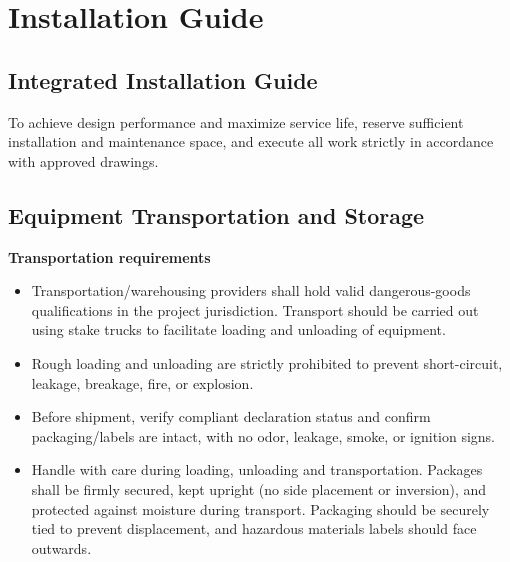 \documentclass[11pt, a4paper]{article}
\begin{document}
\section{Installation Guide}
\subsection{Integrated Installation Guide}
To achieve design performance and maximize service life, reserve sufficient installation and maintenance space, and execute all work strictly in accordance with approved drawings.

\subsection{Equipment Transportation and Storage}
\textbf{Transportation requirements}
\begin{itemize}[leftmargin=1.5em]
    \item Transportation/warehousing providers shall hold valid dangerous-goods qualifications in the project jurisdiction. Transport should be carried out using stake trucks to facilitate loading and unloading of equipment.
    \item Rough loading and unloading are strictly prohibited to prevent short-circuit, leakage, breakage, fire, or explosion.
    \item Before shipment, verify compliant declaration status and confirm packaging/labels are intact, with no odor, leakage, smoke, or ignition signs.
    \item Handle with care during loading, unloading and transportation. Packages shall be firmly secured, kept upright (no side placement or inversion), and protected against moisture during transport. Packaging should be securely tied to prevent displacement, and hazardous materials labels should face outwards.
\end{itemize}
\end{document}
